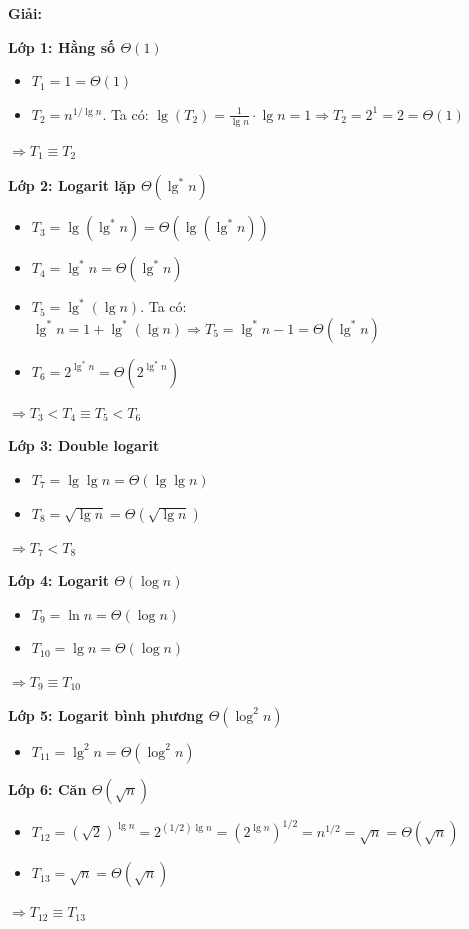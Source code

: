 \documentclass[12pt,a4paper]{article}
\begin{document}
\textbf{Giải:}

\textbf{Lớp 1: Hằng số $\Theta(1)$}
\begin{itemize}
    \item $T_1 = 1 = \Theta(1)$
    \item $T_2 = n^{1/\lg n}$. Ta có: $\lg(T_2) = \frac{1}{\lg n} \cdot \lg n = 1 \Rightarrow T_2 = 2^1 = 2 = \Theta(1)$
\end{itemize}
$\Rightarrow T_1 \equiv T_2$

\textbf{Lớp 2: Logarit lặp $\Theta(\lg^* n)$}
\begin{itemize}
    \item $T_3 = \lg(\lg^* n) = \Theta(\lg(\lg^* n))$
    \item $T_4 = \lg^* n = \Theta(\lg^* n)$
    \item $T_5 = \lg^*(\lg n)$. Ta có: $\lg^* n = 1 + \lg^*(\lg n) \Rightarrow T_5 = \lg^* n - 1 = \Theta(\lg^* n)$
    \item $T_6 = 2^{\lg^* n} = \Theta(2^{\lg^* n})$
\end{itemize}
$\Rightarrow T_3 < T_4 \equiv T_5 < T_6$

\textbf{Lớp 3: Double logarit}
\begin{itemize}
    \item $T_7 = \lg \lg n = \Theta(\lg \lg n)$
    \item $T_8 = \sqrt{\lg n} = \Theta(\sqrt{\lg n})$
\end{itemize}
$\Rightarrow T_7 < T_8$

\textbf{Lớp 4: Logarit $\Theta(\log n)$}
\begin{itemize}
    \item $T_9 = \ln n = \Theta(\log n)$
    \item $T_{10} = \lg n = \Theta(\log n)$
\end{itemize}
$\Rightarrow T_9 \equiv T_{10}$

\textbf{Lớp 5: Logarit bình phương $\Theta(\log^2 n)$}
\begin{itemize}
    \item $T_{11} = \lg^2 n = \Theta(\log^2 n)$
\end{itemize}

\textbf{Lớp 6: Căn $\Theta(\sqrt{n})$}
\begin{itemize}
    \item $T_{12} = (\sqrt{2})^{\lg n} = 2^{(1/2)\lg n} = (2^{\lg n})^{1/2} = n^{1/2} = \sqrt{n} = \Theta(\sqrt{n})$
    \item $T_{13} = \sqrt{n} = \Theta(\sqrt{n})$
\end{itemize}
$\Rightarrow T_{12} \equiv T_{13}$
\end{document}
